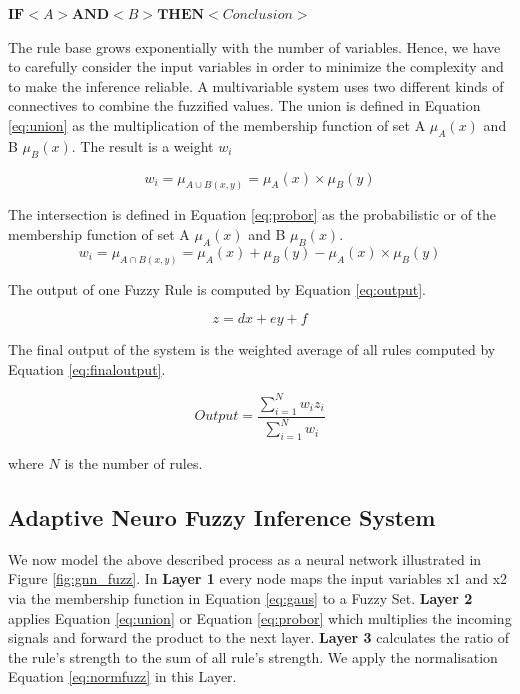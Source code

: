 \centerline {$ \textbf{IF} <  A  > \textbf{AND} <  B  > \textbf{THEN} < Conclusion > $}

The rule base grows exponentially with the number of variables. Hence, we have to carefully consider the input variables in order to minimize the complexity and to make the inference reliable. A multivariable system uses two different kinds of connectives to combine the fuzzified values. The union is defined in Equation \ref{eq:union} as the multiplication of the membership function of set A $\mu_A(x)$ and B $\mu_B(x).$ The result is a weight $w_i$


 \begin{equation} \label{eq:union}
 w_i =  \mu_{A\cup B(x,y)} =   \mu_A (x) \times \mu_B(y)
 \end{equation}

The intersection is defined in Equation \ref{eq:probor} as the probabilistic or of the membership function of set A $\mu_A(x)$ and B $\mu_B(x).$ 
\begin{equation} \label{eq:probor}
 w_i =  \mu_{A\cap B(x,y)} =   \mu_A (x)  + \mu_B(y) -  \mu_A (x)  \times \mu_B(y)
 \end{equation}

The output of one Fuzzy Rule is computed by Equation \ref{eq:output}. 


\begin{equation} \label{eq:output}
 z = dx + ey + f  \end{equation}

The final output of the system is the weighted average of all rules computed by Equation \ref{eq:finaloutput}.

\begin{equation} \label{eq:finaloutput}
Output = \frac { \sum\limits_{i=1}^N  w_i z_i} {\sum\limits_{i=1}^N  w_i } \end{equation}

where $N$ is the number of rules. 

\subsection{Adaptive Neuro Fuzzy Inference System }

We now model the above described process as a neural network illustrated in Figure \ref{fig:gnn_fuzz}. In \textbf{Layer 1} every node maps the input variables x1 and x2 via the membership function in Equation \ref{eq:gaus} to a Fuzzy Set.  \textbf{Layer 2} applies Equation \ref{eq:union} or Equation \ref{eq:probor} which multiplies the incoming signals and forward the product to the next layer. \textbf {Layer 3} calculates the ratio of the rule's strength to the sum of all rule's strength. We apply the normalisation Equation \ref{eq:normfuzz} in this Layer. 

